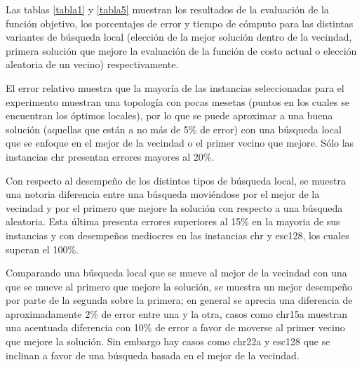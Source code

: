 \documentclass{ci5652}
\begin{document}
\begin{table*}[p]
\end{table*} 

\begin{table*}[p]
\end{table*} 

Las tablas \ref{tabla1} y \ref{tabla5} muestran los resultados de la evaluación de la función objetivo, los porcentajes de error y tiempo de cómputo para las distintas variantes de búsqueda local (elección de la mejor solución dentro de la vecindad, primera solución que mejore la evaluación de la función de costo actual o elección aleatoria de un vecino) respectivamente.

El error relativo muestra que la mayoría de las instancias seleccionadas para el experimento muestran una topología con pocas mesetas (puntos en los cuales se encuentran los óptimos locales), por lo que se puede aproximar a una buena solución (aquellas que están a no más de 5\% de error) con una búsqueda local que se enfoque en el mejor de la vecindad o el primer vecino que mejore. Sólo las instancias chr presentan errores mayores al 20\%.

Con respecto al desempeño de los distintos tipos de búsqueda local, se muestra una notoria diferencia entre una búsqueda moviéndose por el mejor de la vecindad y por el primero que mejore la solución con respecto a una búsqueda aleatoria. Esta última presenta errores superiores al 15\% en la mayoria de sus instancias y con desempeños mediocres en las instancias chr y esc128, los cuales superan el 100\%.

Comparando una búsqueda local que se mueve al mejor de la vecindad con una que se mueve al primero que mejore la solución, se muestra un mejor desempeño por parte de la segunda sobre la primera; en general se aprecia una diferencia de aproximadamente 2\% de error entre una y la otra, casos como chr15a muestran una acentuada diferencia con 10\% de error a favor de moverse al primer vecino que mejore la solución. Sin embargo hay casos como chr22a y esc128 que se inclinan a favor de una búsqueda basada en el mejor de la vecindad.
\end{document}
